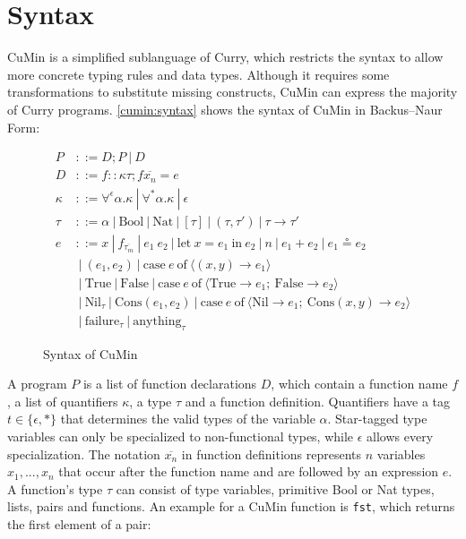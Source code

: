 \documentclass[fleqn]{scrreprt}
\begin{document}
\section{Syntax}
CuMin is a simplified sublanguage of Curry, which restricts the syntax to allow more concrete typing rules and data types. Although it requires some transformations to substitute missing constructs, CuMin can express the majority of Curry programs.
\autoref{cumin:syntax} shows the syntax of CuMin in Backus–Naur Form:
\begin{figure}[H]
	\begin{align*}
	P &::= D;P \:|\:D \\
	D &::= f :: \kappa \tau; f \overline{x_{n}} = e\\
	\kappa &::= \forall^{\epsilon} \alpha.\kappa \:|\: \forall^{*}\alpha.\kappa \:|\: \epsilon \\
	\tau &::= \alpha \:|\: \text{Bool} \:|\: \text{Nat} \:|\: [\tau] \:|\: (\tau,\tau ') \:|\: \tau \rightarrow \tau ' \\
	e &::= x \:|\: f_{\overline{\tau_{m}}} \:|\: e_{1}\: e_{2} \:|\: \text{let}\: x = e_{1} \:\text{in}\: e_{2} \:|\: n \:|\: e_{1} + e_{2} \:|\: e_{1} \circeq e_{2}\\
	&\:|\: (e_{1},e_{2}) \:|\: \text{case}\: e \:\text{of}\: \langle (x,y) \rightarrow e_{1}\rangle\\
	&\:|\: \text{True} \:|\: \text{False} \:|\: \text{case}\: e \:\text{of}\: \langle \text{True} \rightarrow e_{1};\:\text{False} \rightarrow e_{2}\rangle\\
	&\:|\: \text{Nil}_{\tau} \:|\: \text{Cons}(e_{1}, e_{2}) \:|\: \text{case}\: e \:\text{of}\: \langle \text{Nil} \rightarrow e_{1};\:\text{Cons}(x,y) \rightarrow e_{2}\rangle\\
	&\:|\: \text{failure}_{\tau} \:|\: \text{anything}_{\tau}
	\end{align*}
	\caption{Syntax of CuMin}
	\label{cumin:syntax}
\end{figure}
A program $P$ is a list of function declarations $D$, which contain a function name $f$, a list of quantifiers $\kappa$, a type $\tau$ and a function definition. Quantifiers have a tag $t \in \{\epsilon, *\}$ that determines the valid types of the variable $\alpha$. Star-tagged type variables can only be specialized to non-functional types, while $\epsilon$ allows every specialization. The notation $\overline{x_{n}}$ in function definitions represents $n$ variables $x_{1},...,x_{n}$ that occur after the function name and are followed by an expression $e$. A function's type $\tau$ can consist of type variables, primitive Bool or Nat types, lists, pairs and functions. An example for a CuMin function is \texttt{fst}, which returns the first element of a pair:
\end{document}
